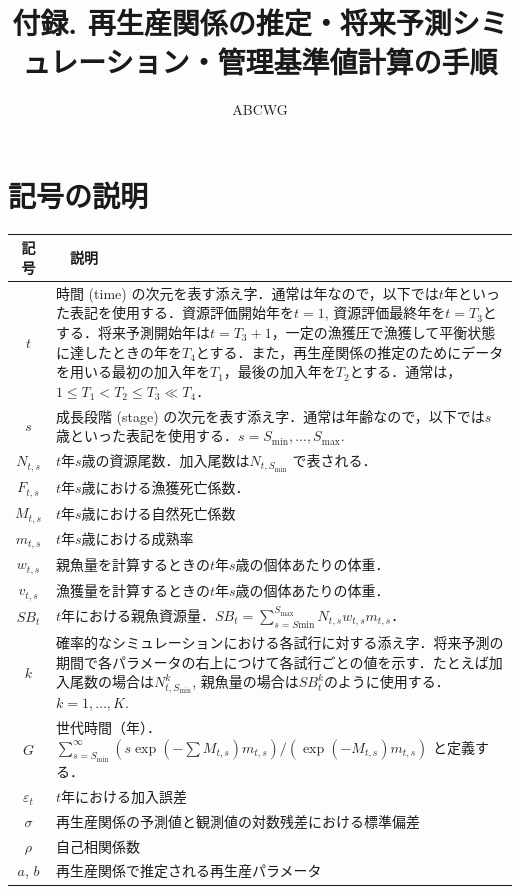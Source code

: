 \documentclass[11pt]{jsarticle}
\begin{document}
\title{付録. 再生産関係の推定・将来予測シミュレーション・管理基準値計算の手順}
\author{ABCWG}
\maketitle

\section{記号の説明}
\begin{table}[h]
  \begin{tabular}{cp{14cm}} \hline
    記号    & 　説明 \\ \hline
    $t$ & 時間 (time) の次元を表す添え字．通常は年なので，以下では$t$年といった表記を使用する．資源評価開始年を$t=1$, 資源評価最終年を$t=T_3$とする．将来予測開始年は$t=T_{3}+1$，一定の漁獲圧で漁獲して平衡状態に達したときの年を$T_4$とする．また，再生産関係の推定のためにデータを用いる最初の加入年を$T_1$，最後の加入年を$T_2$とする．通常は，$1 \leq T_1 < T_2 \leq T_3 \ll T_4$．\\
    $s$ & 成長段階 (stage) の次元を表す添え字．通常は年齢なので，以下では$s$歳といった表記を使用する．$s=S_{\mathrm{min}},...,S_{\mathrm{max}}$.\\
    $N_{t,s}$ & $t$年$s$歳の資源尾数．加入尾数は$N_{t,S_{\mathrm{min}}}$ で表される．\\
    $F_{t,s}$ & $t$年$s$歳における漁獲死亡係数．\\
    $M_{t,s}$ & $t$年$s$歳における自然死亡係数\\
    $m_{t,s}$ & $t$年$s$歳における成熟率\\
    $w_{t,s}$ & 親魚量を計算するときの$t$年$s$歳の個体あたりの体重．\\
    $v_{t,s}$ & 漁獲量を計算するときの$t$年$s$歳の個体あたりの体重．\\
    $SB_{t} $ & $t$年における親魚資源量．$SB_t=\sum_{s=S\mathrm{min}}^{S_{\mathrm{max}}}N_{t,s} w_{t,s} m_{t,s}$．\\
    $k$      & 確率的なシミュレーションにおける各試行に対する添え字．将来予測の期間で各パラメータの右上につけて各試行ごとの値を示す．たとえば加入尾数の場合は$N_{t,S_{\mathrm{min}}}^k$, 親魚量の場合は$SB_t^k$のように使用する．$k=1,…,K$.\\
    $G$       & 世代時間（年）．$\sum_{s=S_{\mathrm{min}}}^\infty (s \exp(-\sum M_{t,s}) m_{t, s})/(\exp(-M_{t,s}) m_{t,s})$ と定義する．\\
    $\varepsilon_t$  & $t$年における加入誤差\\
    $\sigma$  & 再生産関係の予測値と観測値の対数残差における標準偏差\\
    $\rho$  & 自己相関係数\\
    $a$, $b$  & 再生産関係で推定される再生産パラメータ\\ \hline
  \end{tabular}
\end{table}
\end{document}
